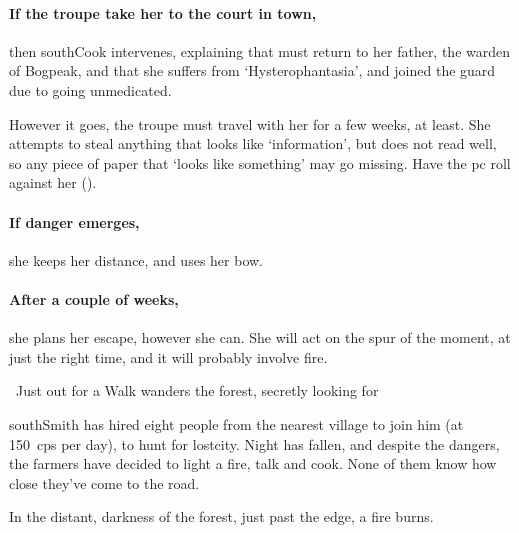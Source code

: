 \paragraph{If the troupe take her to the \gls{court} in \gls{town},}
then \gls{southCook} intervenes, explaining that  must return to her father, the \gls{warden} of Bogpeak, and that she suffers from `Hysterophantasia', and joined the \gls{guard} due to going unmedicated.

However it goes, the troupe must travel with her for a few weeks, at least.
She attempts to steal anything that looks like `information', but does not read well, so any piece of paper that `looks like something' may go missing.
Have the \gls{pc} roll  against her  (\tn).

\paragraph{If danger emerges,}
she keeps her distance, and uses her bow.

\paragraph{After a couple of weeks,}
she plans her escape, however she can.
She will act on the spur of the moment, at just the right time, and it will probably involve fire.

\southRogue
\label{southRogue}

{~Just out for a Walk}%
{ wanders the forest, secretly looking for }%

\begin{exampletext}
  \Gls{southSmith} has hired eight people from the nearest \gls{village} to join him (at 150~\glspl{cp} per day), to hunt for \gls{lostcity}.
  Night has fallen, and despite the dangers, the farmers have decided to light a fire, talk and cook.
  None of them know how close they've come to the road.
\end{exampletext}

\begin{boxtext}
  In the distant, darkness of the forest, just past the \gls{edge}, a fire burns.
\end{boxtext}


